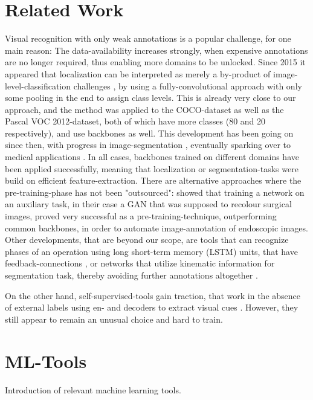 \section{Related Work}
Visual recognition with only weak annotations is a popular challenge, for one main reason: The data-availability increases strongly, when expensive annotations are no longer required, thus enabling more domains to be unlocked. Since 2015 it appeared that localization can be interpreted as merely a by-product of image-level-classification challenges \citep{Localization_free}, by using a fully-convolutional approach with only some pooling in the end to assign class levels. This is already very close to our approach, and the method was applied to the COCO-dataset as well as the Pascal VOC 2012-dataset, both of which have more classes (80 and 20 respectively), and use backbones as well. This development has been going on since then, with progress in image-segmentation \citep{classpeak}, eventually sparking over to medical applications \citep{Vardazaryan}. 
In all cases, backbones trained on different domains have been applied successfully, meaning that localization or segmentation-tasks were build on efficient feature-extraction. There are alternative approaches where the pre-training-phase has not been "outsourced": \cite{ross2018exploiting} showed that training a network on an auxiliary task, in their case a GAN that was supposed to recolour surgical images, proved very successful as a pre-training-technique, outperforming common backbones, in order to automate image-annotation of endoscopic images.
Other developments, that are beyond our scope, are tools that can recognize phases of an operation using long short-term memory (LSTM) units, that have feedback-connections \cite{lstm}, or networks that utilize kinematic information for segmentation task, thereby avoiding further annotations altogether \cite{da2019self}.

On the other hand, self-supervised-tools gain traction, that work in the absence of external labels using en- and decoders to extract visual cues \cite{VAE_discussion}. However, they still appear to remain an unusual choice and hard to train.

\section{ML-Tools}
Introduction of relevant machine learning tools.

